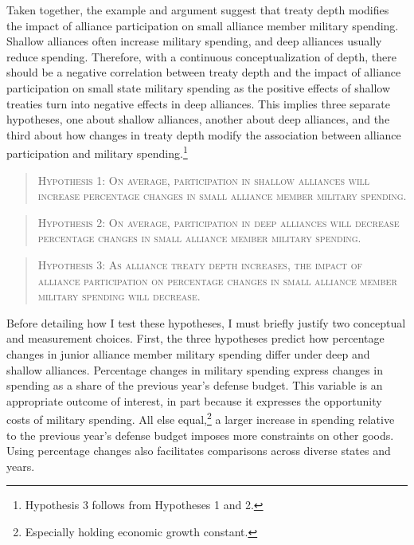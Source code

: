 \documentclass[12pt]{article}
\begin{document}
 
Taken together, the example and argument suggest that treaty depth modifies the impact of alliance participation on small alliance member military spending. 
Shallow alliances often increase military spending, and deep alliances usually reduce spending.  
Therefore, with a continuous conceptualization of depth, there should be a negative correlation between treaty depth and the impact of alliance participation on small state military spending as the positive effects of shallow treaties turn into negative effects in deep alliances. 
This implies three separate hypotheses, one about shallow alliances, another about deep alliances, and the third about how changes in treaty depth modify the association between alliance participation and military spending.\footnote{Hypothesis 3 follows from Hypotheses 1 and 2.}
 

\begin{quote}
\textsc{Hypothesis 1: On average, participation in shallow alliances will increase percentage changes in small alliance member military spending.}
\end{quote}

\begin{quote}
\textsc{Hypothesis 2: On average, participation in deep alliances will decrease percentage changes in small alliance member military spending.}
\end{quote}

\begin{quote}
\textsc{Hypothesis 3: As alliance treaty depth increases, the impact of alliance participation on percentage changes in small alliance member military spending will decrease.}
\end{quote}


Before detailing how I test these hypotheses, I must briefly justify two conceptual and measurement choices. 
First, the three hypotheses predict how percentage changes in junior alliance member military spending differ under deep and shallow alliances. 
Percentage changes in military spending express changes in spending as a share of the previous year's defense budget.
This variable is an appropriate outcome of interest, in part because it expresses the opportunity costs of military spending. 
All else equal,\footnote{Especially holding economic growth constant.} a larger increase in spending relative to the previous year's defense budget imposes more constraints on other goods. 
Using percentage changes also facilitates comparisons across diverse states and years. 
\end{document}
